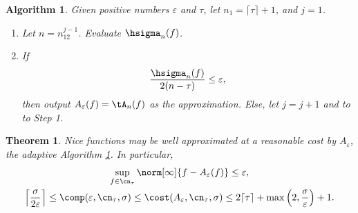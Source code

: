 \documentclass[12pt]{amsart}
\newtheorem{theorem}{Theorem}
\newtheorem{algo}{Algorithm}
\begin{document}
\begin{algo} \label{adapappxalgo} Given positive numbers $\varepsilon$ and $\tau$, let $n_1=\lceil \tau \rceil +1$, and $j=1$. 
\begin{enumerate}
\renewcommand{\labelenumi}{Step \arabic{enumi}.} 
\item Let $n=n_12^{j-1}$.  Evaluate $\hsigma_{n}(f)$.
\item If 
\[
\frac{\hsigma_n(f)}{2(n - \tau)} \le 
\varepsilon,
\]
then output $A_{\varepsilon}(f) = \tA_{n}(f)$ as the approximation.  Else, let $j=j+1$ and to to Step 1.
\end{enumerate}
\end{algo}

\begin{theorem} \label{adapappxthm}  \emph{Nice} functions may be well approximated at a reasonable cost by $A_{\varepsilon}$, the adaptive Algorithm \ref{adapappxalgo}.  In particular,
\begin{gather*}
\sup_{f \in \cn_{\tau}} \norm[\infty]{f - A_{\varepsilon}(f)} \le \varepsilon, \\
\left \lceil \frac{\sigma}{2\varepsilon} \right \rceil \le \comp(\varepsilon,\cn_{\tau},\sigma) \le \cost(A_{\varepsilon},\cn_{\tau},\sigma) \le 2 \lceil \tau \rceil + \max\left(2,\frac{\sigma}{\varepsilon} \right) + 1.
\end{gather*}
\end{theorem}
\end{document}
